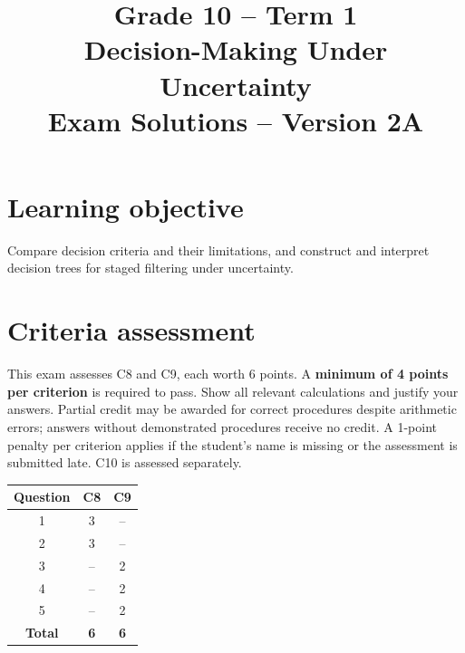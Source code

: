 \makeatletter
{}
\makeatother

\title{Grade 10 -- Term 1\\Decision-Making Under Uncertainty\\Exam Solutions -- Version 2A}
\author{}\date{}

\maketitle
\setcounter{tocdepth}{1}\setcounter{secnumdepth}{2}
\label{toc}\tableofcontents
\section*{Learning objective}
Compare decision criteria and their limitations, and construct and interpret decision trees for staged filtering under uncertainty.
\section*{Criteria assessment}
This exam assesses C8 and C9, each worth 6 points. A \textbf{minimum of 4 points per criterion} is required to pass. Show all relevant calculations and justify your answers. Partial credit may be awarded for correct procedures despite arithmetic errors; answers without demonstrated procedures receive no credit. A 1-point penalty per criterion applies if the student's name is missing or the assessment is submitted late. C10 is assessed separately.
\begin{center}
\begin{tabular}{|c|c|c|}
				\hline
				\textbf{Question} & \textbf{C8} & \textbf{C9} \\ \hline
				1 & 3 & -- \\ \hline
				2 & 3 & -- \\ \hline
				3 & -- & 2 \\ \hline
				4 & -- & 2 \\ \hline
				5 & -- & 2 \\ \hline
				\textbf{Total} & \textbf{6} & \textbf{6} \\ \hline
			\end{tabular}
\end{center}
